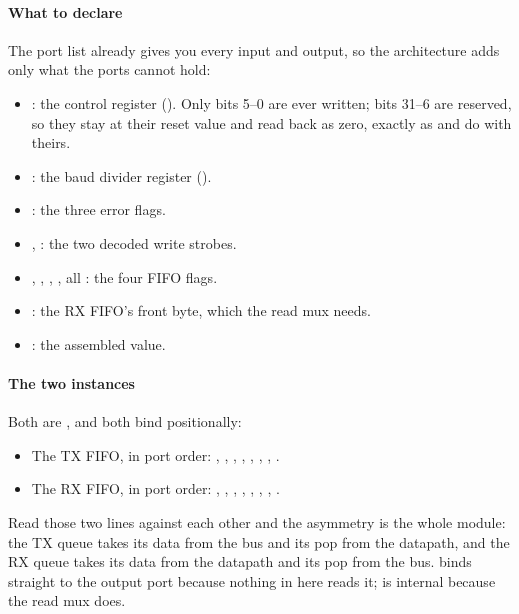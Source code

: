 \paragraph{What to declare} The port list already gives you every input and output, so the
architecture adds only what the ports cannot hold:
\begin{itemize}
  \item {}: the control register (). Only bits 5--0 are ever written;
    bits 31--6 are reserved, so they stay at their reset value and read back as zero, exactly as
     and  do with theirs.
  \item {}: the baud divider register ().
  \item {}: the three error flags.
  \item {}, : the two decoded write strobes.
  \item {}, , , , all
    : the four FIFO flags.
  \item {}: the RX FIFO's front byte, which the read mux needs.
  \item {}: the assembled  value.
\end{itemize}

\paragraph{The two  instances} Both are , and both bind
positionally:
\begin{itemize}
  \item The TX FIFO, in port order: , , ,
    , , , , .
  \item The RX FIFO, in port order: , , ,
    , , , , .
\end{itemize}
Read those two lines against each other and the asymmetry is the whole module: the TX queue takes
its data from the bus and its pop from the datapath, and the RX queue takes its data from the
datapath and its pop from the bus.  binds straight to the output port because nothing
in here reads it;  is internal because the read mux does.

